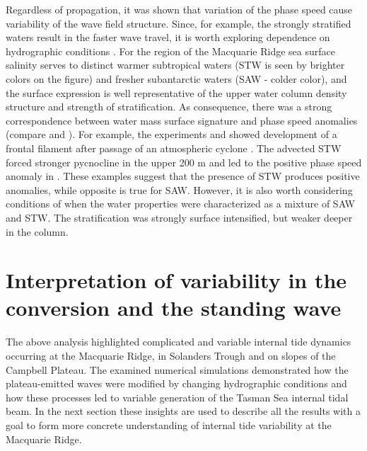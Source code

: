 \documentclass[12pt]{article}
\begin{document}
Regardless of propagation, it was shown that variation of the phase speed cause variability of the 
wave field structure. Since, for example, the strongly stratified waters result in the faster wave 
travel, it is worth exploring dependence on hydrographic conditions . 
For the region of 
the Macquarie 
Ridge sea surface salinity serves to distinct warmer subtropical waters (STW is seen by brighter 
colors on the figure) and fresher subantarctic waters (SAW - colder color), and the surface 
expression is well representative of the upper water column density structure and strength of 
stratification. As consequence, there was a strong correspondence between water mass surface 
signature and phase speed anomalies (compare  and 
). For 
example, the experiments  and  showed development of a frontal filament 
after passage of an atmospheric cyclone . The advected STW forced 
stronger pycnocline in the upper 200 m  and led to the positive phase speed anomaly in . These examples suggest that 
the presence of STW produces positive anomalies, while opposite is true for SAW. 
However, it is also worth considering conditions of  when the water properties were 
characterized as a mixture of SAW and STW. The stratification was strongly surface intensified, but 
weaker deeper in the column.\\

\section{Interpretation of variability in the conversion and the standing wave}
The above analysis highlighted complicated and variable internal tide dynamics occurring at the 
Macquarie Ridge, in Solanders Trough and on slopes of the Campbell Plateau. The examined numerical 
simulations demonstrated how the plateau-emitted waves were modified by changing hydrographic 
conditions and how these processes led to variable generation of the Tasman Sea 
internal tidal beam. In the next section these insights are used to describe all the results with a 
goal to form more concrete understanding of internal tide variability at the Macquarie Ridge.
\end{document}
